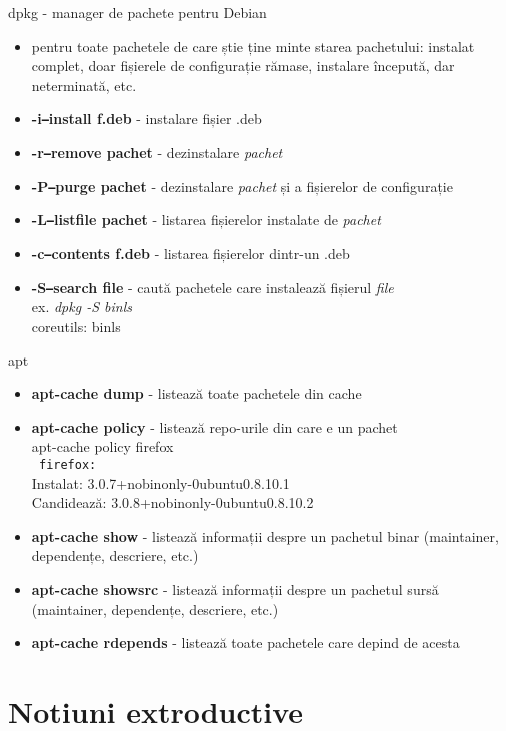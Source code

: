 \documentclass{beamer}
\begin{document}
\begin{frame}{dpkg - manager de pachete pentru Debian}
  \begin{itemize}
  \item pentru toate pachetele de care știe ține minte starea pachetului: 
    instalat complet, doar fișierele de configurație rămase, instalare începută,
    dar neterminată, etc.
  \item \textbf{-i\/\texttt{--}install f.deb} - instalare fișier .deb
  \item \textbf{-r\/\texttt{--}remove pachet} - dezinstalare \textit{pachet}
  \item \textbf{-P\/\texttt{--}purge pachet} - dezinstalare \textit{pachet} și a fișierelor de configurație
  \item \textbf{-L\/\texttt{--}listfile pachet} - listarea fișierelor instalate de \textit{pachet}
  \item \textbf{-c\/\texttt{--}contents f.deb} - listarea fișierelor dintr-un .deb
  \item \textbf{-S\/\texttt{--}search file} - caută pachetele care instalează fișierul \textit{file} \\
    ex. \textit{dpkg -S \/bin\/ls} \\
    coreutils: \/bin\/ls
  \end{itemize}
\end{frame}


\begin{frame}{apt}
  \begin{itemize}
  \item \textbf{apt-cache dump} - listează toate pachetele din cache
  \item \textbf{apt-cache policy} - listează repo-urile din care e un pachet \\
    apt-cache policy firefox \\
    \texttt{   firefox:}\\
    Instalat: 3.0.7+nobinonly-0ubuntu0.8.10.1 \\
    Candidează: 3.0.8+nobinonly-0ubuntu0.8.10.2
  \item \textbf{apt-cache show} - listează informații despre un pachetul binar (maintainer, dependențe, descriere, etc.)
  \item \textbf{apt-cache showsrc} - listează informații despre un pachetul sursă (maintainer, dependențe, descriere, etc.)
  \item \textbf{apt-cache rdepends} - listează toate pachetele care depind de acesta
  \end{itemize}

\end{frame}


\section{Notiuni extroductive}

\frame{\tableofcontents[currentsection]}
\end{document}
